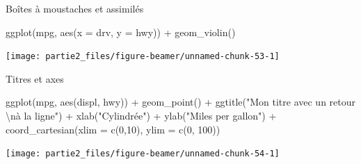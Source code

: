 \documentclass[12pt,ignorenonframetext,]{beamer}
\newenvironment{Shaded}{}{}
\newcommand{\KeywordTok}[1]{\textcolor[rgb]{0.00,0.00,1.00}{#1}}
\newcommand{\DataTypeTok}[1]{#1}
\newcommand{\DecValTok}[1]{#1}
\newcommand{\CharTok}[1]{\textcolor[rgb]{0.00,0.50,0.50}{#1}}
\newcommand{\StringTok}[1]{\textcolor[rgb]{0.00,0.50,0.50}{#1}}
\newcommand{\OperatorTok}[1]{#1}
\newcommand{\NormalTok}[1]{#1}
\renewenvironment{Shaded}{\begin{snugshade}}{\end{snugshade}}
\begin{document}
\begin{frame}[fragile]{Boîtes à moustaches et assimilés}

\footnotesize \center

\begin{Shaded}
\begin{Highlighting}[]
\KeywordTok{ggplot}\NormalTok{(mpg, }\KeywordTok{aes}\NormalTok{(}\DataTypeTok{x =}\NormalTok{ drv, }\DataTypeTok{y =}\NormalTok{ hwy)) }\OperatorTok{+}\StringTok{ }
\StringTok{  }\KeywordTok{geom_violin}\NormalTok{()}
\end{Highlighting}
\end{Shaded}

\texttt{[image: partie2\_files/figure-beamer/unnamed-chunk-53-1]}

\end{frame}

\begin{frame}[fragile]{Titres et axes}

\footnotesize \center

\begin{Shaded}
\begin{Highlighting}[]
\KeywordTok{ggplot}\NormalTok{(mpg, }\KeywordTok{aes}\NormalTok{(displ, hwy)) }\OperatorTok{+}\StringTok{ }\KeywordTok{geom_point}\NormalTok{() }\OperatorTok{+}\StringTok{ }
\StringTok{  }\KeywordTok{ggtitle}\NormalTok{(}\StringTok{"Mon titre avec un retour }\CharTok{\textbackslash{}n}\StringTok{à la ligne"}\NormalTok{) }\OperatorTok{+}
\StringTok{  }\KeywordTok{xlab}\NormalTok{(}\StringTok{"Cylindrée"}\NormalTok{) }\OperatorTok{+}\StringTok{ }\KeywordTok{ylab}\NormalTok{(}\StringTok{"Miles per gallon"}\NormalTok{) }\OperatorTok{+}
\StringTok{  }\KeywordTok{coord_cartesian}\NormalTok{(}\DataTypeTok{xlim =} \KeywordTok{c}\NormalTok{(}\DecValTok{0}\NormalTok{,}\DecValTok{10}\NormalTok{), }\DataTypeTok{ylim =} \KeywordTok{c}\NormalTok{(}\DecValTok{0}\NormalTok{, }\DecValTok{100}\NormalTok{))}
\end{Highlighting}
\end{Shaded}

\texttt{[image: partie2\_files/figure-beamer/unnamed-chunk-54-1]}

\end{frame}
\end{document}
